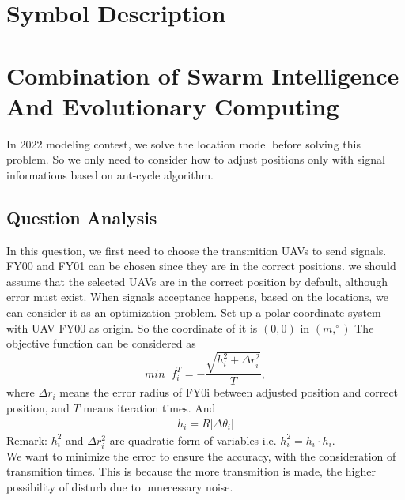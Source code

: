 \documentclass[11pt,en]{elegantpaper}
\begin{document}
\section{Symbol Description}
\begin{center}
\end{center}

\section{Combination of Swarm Intelligence And Evolutionary Computing}
In 2022 modeling contest, we solve the location model before solving this problem.
So we only need to consider how to adjust positions only with signal informations based on ant-cycle algorithm.
\subsection{Question Analysis}
In this question, we first need to choose the transmition UAVs to send signals.
FY00 and FY01 can be chosen since they are in the correct positions.
we should assume that the selected UAVs are in the correct position by default, although error must exist.
When signals acceptance happens, based on the locations, we can consider it as an optimization problem.
Set up a polar coordinate system with UAV FY00 as origin.
So the coordinate of it is $(0,0)$ in $(m,^{\circ})$
The objective function can be considered as 
\[
  min\;\; f_i^T = -\frac{\sqrt{ h_i^2 + \Delta r_i^2}}{T},
  \]
where $\Delta r_i$ means the error radius of FY0i between adjusted position and correct position, and $T$ means iteration times.
And 
\begin{align*}
  h_i = R\lvert \Delta \theta_i \rvert
\end{align*}
Remark: $h_i^2$ and $\Delta r_i^2$ are quadratic form of variables i.e. $h_i^2 = h_i\cdot h_i$.\\
We want to minimize the error to ensure the accuracy, with the consideration of transmition times.
This is because the more transmition is made, the higher possibility of disturb due to unnecessary noise.
\end{document}
